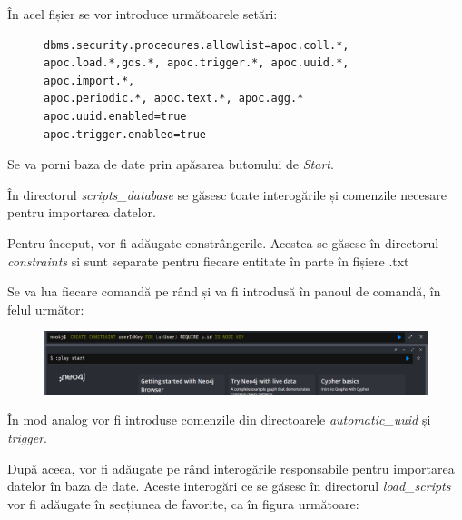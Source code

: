 \documentclass[12pt,a4paper]{report}
\begin{document}
\begin{enumerate}
  În acel fișier se vor introduce următoarele setări:
  
  \begin{figure}[H]
\begin{BVerbatim}
dbms.security.procedures.allowlist=apoc.coll.*,
apoc.load.*,gds.*, apoc.trigger.*, apoc.uuid.*, apoc.import.*,
apoc.periodic.*, apoc.text.*, apoc.agg.*
apoc.uuid.enabled=true
apoc.trigger.enabled=true
\end{BVerbatim}
\end{figure}  
  
  Se va porni baza de date prin apăsarea butonului de \emph{Start}.
  
  În directorul \emph{scripts\_database} se găsesc toate interogările și comenzile necesare pentru importarea datelor.
  
  Pentru început, vor fi adăugate constrângerile. Acestea se găsesc în directorul \emph{constraints} și sunt separate pentru fiecare entitate în parte în fișiere .txt
  
  Se va lua fiecare comandă pe rând și va fi introdusă în panoul de comandă, în felul următor:
  
      \begin{figure}[H]
\centering
\caption{}
\begin{adjustbox}{max size={\textwidth}{\textheight}}
\includegraphics[scale=1]{exemplu_53_panou}
\end{adjustbox}
\caption*{}
\end{figure}

În mod analog vor fi introduse comenzile din directoarele \emph{automatic\_uuid} și \emph{trigger}.

După aceea, vor fi adăugate pe rând interogările responsabile pentru importarea datelor în baza de date. Aceste interogări ce se găsesc în directorul \emph{load\_scripts} vor fi adăugate în secțiunea de favorite, ca în figura următoare:


\end{enumerate}
\end{document}
